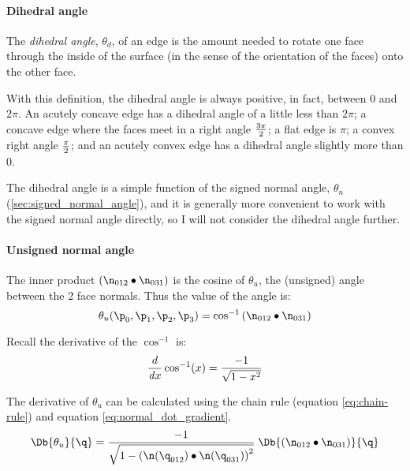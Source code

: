 
\paragraph{Dihedral angle}
\label{sec:Dihedral-angle}

The {\it dihedral angle},
$\theta_d$,
 of an edge is the amount
needed to rotate one face
through the inside of the surface
(in the sense of the orientation of the faces)
onto the other face.

With this definition, the dihedral angle is always
positive, in fact, between $0$ and $2\pi$.
An acutely concave edge has a dihedral angle
of a little less than $2\pi$;
a concave edge where the faces meet in a right angle
${3\pi} \over 2$;
a flat edge is $\pi$;
a convex right angle $\pi \over 2$;
and an acutely convex edge has a dihedral angle
slightly more than $0$.

The dihedral angle is a simple function of the
signed normal angle, $\theta_n$
(\autoref{sec:signed_normal_angle}),
and it is generally more convenient to work
with the signed normal angle directly,
so I will not consider the dihedral angle further.


\paragraph{Unsigned normal angle}
\label{sec:unsigned_normal_angle}

The inner product $\left( \n_{012} \bullet \n_{031} \right)$
is the cosine of $\theta_u$,
the (unsigned) angle between the 2 face normals.
Thus the value of the angle is:
\begin{equation}
\theta_u(\p_0,\p_1,\p_2,\p_3)
= \cos^{-1} \left( \n_{012} \bullet \n_{031} \right)
\end{equation}

Recall the derivative of the $\cos^{-1}$ is:
\begin{equation}
\frac{d}{\mathit dx} \cos^{-1}(x) = { -1 \over \sqrt{1 - x^2} }
\end{equation}

The derivative of $\theta_u$ can be calculated using the chain rule
(equation \ref{eq:chain-rule}) and equation \ref{eq:normal_dot_gradient}.
\begin{equation}
\Db{\theta_u}{\q}
 = { -1 \over \sqrt{1 - \left( \n(\q_{012}) \bullet \n(\q_{031}) \right)^2} }
\; \Db{\left( \n_{012} \bullet \n_{031} \right)}{\q}
\end{equation}

